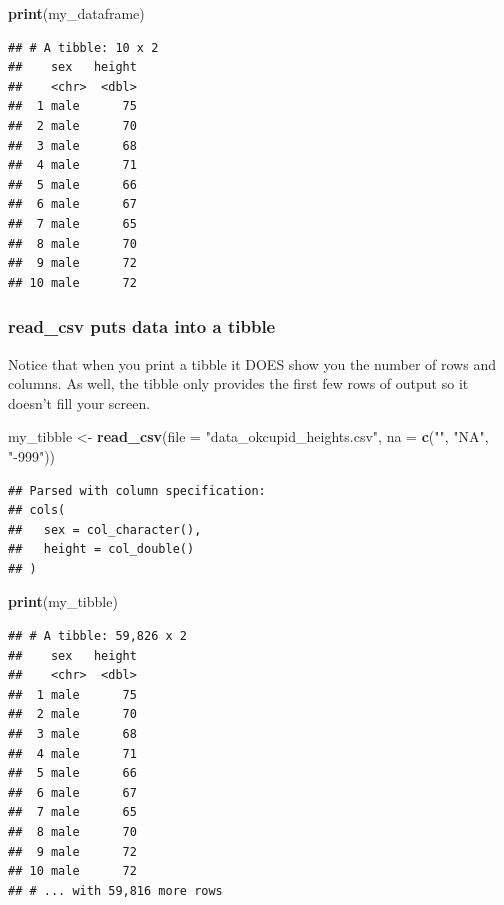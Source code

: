 \documentclass[
]{krantz}
\makeatletter
\newenvironment{Shaded}{\begin{snugshade}}{\end{snugshade}}
\newcommand{\DataTypeTok}[1]{\textcolor[rgb]{0.27,0.27,0.27}{#1}}
\newcommand{\KeywordTok}[1]{\textcolor[rgb]{0.27,0.27,0.27}{\textbf{#1}}}
\newcommand{\NormalTok}[1]{#1}
\newcommand{\StringTok}[1]{\textcolor[rgb]{0.5,0.5,0.5}{#1}}
\newenvironment{kframe}{%
\medskip{}
\setlength{\fboxsep}{.8em}
 \def\at@end@of@kframe{}%
 \ifinner\ifhmode%
  \def\at@end@of@kframe{\end{minipage}}%
  \begin{minipage}{\columnwidth}%
 \fi\fi%
 \def\FrameCommand##1{\hskip\@totalleftmargin \hskip-\fboxsep
 \colorbox{shadecolor}{##1}\hskip-\fboxsep
     \hskip-\linewidth \hskip-\@totalleftmargin \hskip\columnwidth}%
 \MakeFramed {\advance\hsize-\width
   \@totalleftmargin\z@ \linewidth\hsize
   \@setminipage}}%
 {\par\unskip\endMakeFramed%
 \at@end@of@kframe}
\renewenvironment{Shaded}{\begin{kframe}}{\end{kframe}}
\makeatother
\begin{document}
\begin{Shaded}
\begin{Highlighting}[]
\KeywordTok{print}\NormalTok{(my_dataframe)}
\end{Highlighting}
\end{Shaded}

\begin{verbatim}
## # A tibble: 10 x 2
##    sex   height
##    <chr>  <dbl>
##  1 male      75
##  2 male      70
##  3 male      68
##  4 male      71
##  5 male      66
##  6 male      67
##  7 male      65
##  8 male      70
##  9 male      72
## 10 male      72
\end{verbatim}

\hypertarget{read_csv-puts-data-into-a-tibble}{%
\subsubsection{read\_csv puts data into a tibble}\label{read_csv-puts-data-into-a-tibble}}

Notice that when you print a tibble it DOES show you the number of rows and columns. As well, the tibble only provides the first few rows of output so it doesn't fill your screen.

\begin{Shaded}
\begin{Highlighting}[]
\NormalTok{my_tibble <-}\StringTok{ }\KeywordTok{read_csv}\NormalTok{(}\DataTypeTok{file =} \StringTok{"data_okcupid_heights.csv"}\NormalTok{, }
                    \DataTypeTok{na =} \KeywordTok{c}\NormalTok{(}\StringTok{""}\NormalTok{, }\StringTok{"NA"}\NormalTok{, }\StringTok{"-999"}\NormalTok{))}
\end{Highlighting}
\end{Shaded}

\begin{verbatim}
## Parsed with column specification:
## cols(
##   sex = col_character(),
##   height = col_double()
## )
\end{verbatim}

\begin{Shaded}
\begin{Highlighting}[]
\KeywordTok{print}\NormalTok{(my_tibble)}
\end{Highlighting}
\end{Shaded}

\begin{verbatim}
## # A tibble: 59,826 x 2
##    sex   height
##    <chr>  <dbl>
##  1 male      75
##  2 male      70
##  3 male      68
##  4 male      71
##  5 male      66
##  6 male      67
##  7 male      65
##  8 male      70
##  9 male      72
## 10 male      72
## # ... with 59,816 more rows
\end{verbatim}
\end{document}

